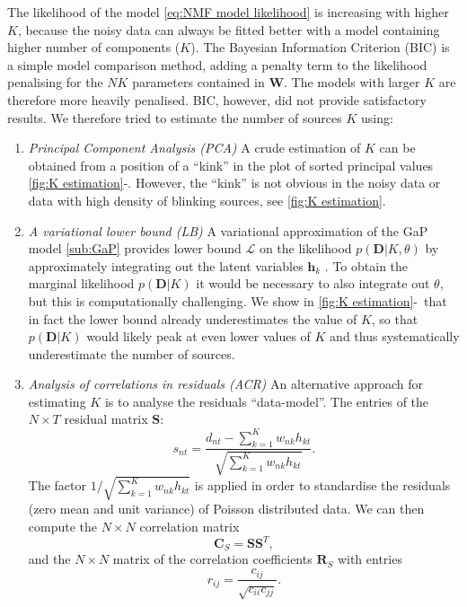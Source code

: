 The likelihood of the model \autoref{eq:NMF model likelihood} is increasing with higher $K$, because the noisy data can always be fitted better with a model containing higher number of components ($K$). The Bayesian Information Criterion (BIC) \cite{Bishop2006} is a simple model comparison method, adding a penalty term to the likelihood penalising for the $NK$ parameters contained in $\bm{W}$. The models with larger $K$ are therefore more heavily penalised. BIC, however, did not provide satisfactory results. 
We therefore tried to estimate the number of sources $K$ using:
%
\begin{enumerate}
	\item 
	\emph{Principal Component Analysis (PCA)}	
	A crude estimation of $K$ can be obtained from a position of a ``kink'' in the plot of sorted principal values \autoref{fig:K estimation}\aaa-\ccc. However, the ``kink'' is not obvious in the noisy data or data with high density of blinking sources, see \autoref{fig:K estimation}\ccc.
	\item
	\emph{A variational lower bound (LB)} 	
	A variational approximation of the GaP model \autoref{sub:GaP} provides lower bound $\mathcal{L}$ on the likelihood $p(\bm{D}|K, \theta)$ by approximately integrating out the latent variables $\bm{h}_k$ \cite{Buntine2006}. To obtain the marginal likelihood $p(\bm{D}|K)$ it would be necessary to also integrate out $\theta$, but this is computationally challenging. We show in \autoref{fig:K estimation}\ddd-\fff\ that in fact the lower bound already underestimates the value of $K$, so that $p(\bm{D}|K)$ would likely peak at even lower values of $K$ and thus systematically underestimate the number of sources.
	
	\item 
	\emph{Analysis of correlations in residuals (ACR)}	
	An alternative approach for estimating $K$ is to analyse the residuals ``data-model''. The entries of the $N\times T$ residual matrix $\bm{S}$:
	\begin{equation}
		s_{nt}=\frac{d_{nt}-\sum_{k=1}^{K}w_{nk}h_{kt}}{\sqrt{\sum_{k=1}^{K}w_{nk}h_{kt}}}.
	\end{equation}
	The factor $1/\sqrt{\sum_{k=1}^{K}w_{nk}h_{kt}}$ is applied in order to standardise the residuals (zero mean and unit variance) of Poisson distributed data. We can then compute the $N\times N$ correlation matrix 
	\begin{equation}
		\bm{C}_{S}=\bm{SS}^{T},
	\end{equation}
	and the $N\times N$ matrix of the correlation coefficients $\bm{R}_{S}$ with entries 
	\begin{equation}
		r_{ij}=\frac{c_{ij}}{\sqrt{c_{ii}c_{jj}}}.
		\label{eq:Correlation in residuals}
	\end{equation}
	

\end{enumerate}
